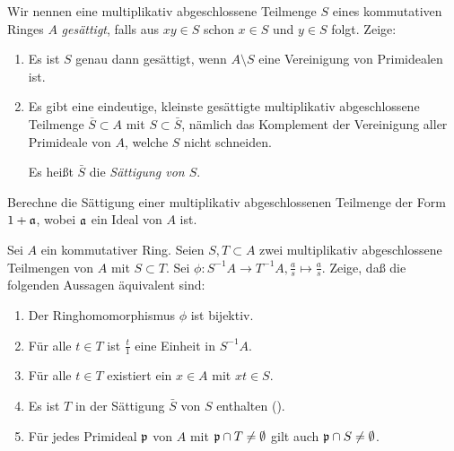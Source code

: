 \begin{exercise}
	\label{exer:mult_sat}
	Wir nennen eine multiplikativ abgeschlossene Teilmenge \(S\) eines kommutativen Ringes \(A\) \emph{gesättigt},
	falls aus \(xy \in S\) schon \(x \in S\) und \(y \in S\) folgt. Zeige:
	\begin{enumerate}
	\item
		Es ist \(S\) genau dann gesättigt, wenn \(A \setminus S\) eine Vereinigung von Primidealen ist.
	\item
		Es gibt eine eindeutige, kleinste gesättigte multiplikativ abgeschlossene Teilmenge \(\bar S \subset A\) mit
		\(S \subset \bar S\), nämlich das Komplement der Vereinigung aller Primideale von \(A\), welche \(S\) nicht schneiden.
		
		Es heißt \(\bar S\) die \emph{Sättigung von \(S\)}.
	\end{enumerate}
	
	Berechne die Sättigung einer multiplikativ abgeschlossenen Teilmenge der Form \(1 + \mathfrak{a}\), wobei
	\(\mathfrak{a}\) ein Ideal von \(A\) ist.
\end{exercise}

\begin{exercise}
	Sei \(A\) ein kommutativer Ring. Seien \(S, T \subset A\) zwei multiplikativ abgeschlossene Teilmengen von \(A\) mit
	\(S \subset T\). Sei \(\phi\colon S^{-1} A \to T^{-1} A, \frac a s \mapsto \frac a s\). Zeige, daß die folgenden Aussagen
	äquivalent sind:
	\begin{enumerate}
	\item	
		Der Ringhomomorphismus \(\phi\) ist bijektiv.
	\item
		Für alle \(t \in T\) ist \(\frac t 1\) eine Einheit in \(S^{-1} A\).
	\item
		Für alle \(t \in T\) existiert ein \(x \in A\) mit \(x t \in S\).
	\item
		Es ist \(T\) in der Sättigung \(\bar S\) von \(S\) enthalten ().
	\item
		Für jedes Primideal \(\mathfrak{p}\) von \(A\) mit \(\mathfrak{p} \cap T \neq \emptyset\) gilt auch
		\(\mathfrak{p} \cap S \neq \emptyset\).
	\end{enumerate}
\end{exercise}

